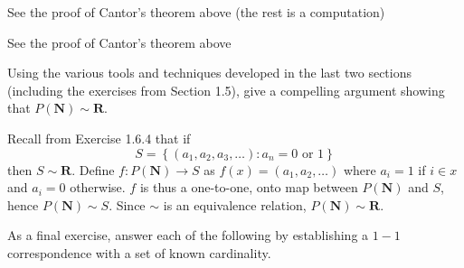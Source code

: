 \begin{exercise}
  See the proof of Cantor's theorem above (the rest is a computation)
\end{exercise}

\begin{exercise}
  See the proof of Cantor's theorem above
\end{exercise}

\begin{exercise}
  Using the various tools and techniques developed in the last two sections (including the exercises from Section 1.5), give a compelling argument showing that $P(\mathbf{N}) \sim \mathbf{R}$.
\end{exercise}

\begin{solution}
Recall from Exercise 1.6.4 that if
  $$
  S=\left\{\left(a_{1}, a_{2}, a_{3}, \ldots\right): a_{n}=0 \text { or } 1\right\}
  $$
then $S \sim \mathbf R$. Define $f : P(\mathbf N) \rightarrow S$ as $f(x) = (a_1, a_2, \ldots)$ where $a_i = 1$ if $i \in x$ and $a_i = 0$ otherwise. $f$ is thus a one-to-one, onto map between $P(\mathbf N)$ and $S$, hence $P(\mathbf N) \sim S$. Since $\sim$ is an equivalence relation, $P(\mathbf N) \sim \mathbf R$.




\end{solution}

\begin{exercise}
  As a final exercise, answer each of the following by establishing a $1-1$ correspondence with a set of known cardinality.
\end{exercise}

